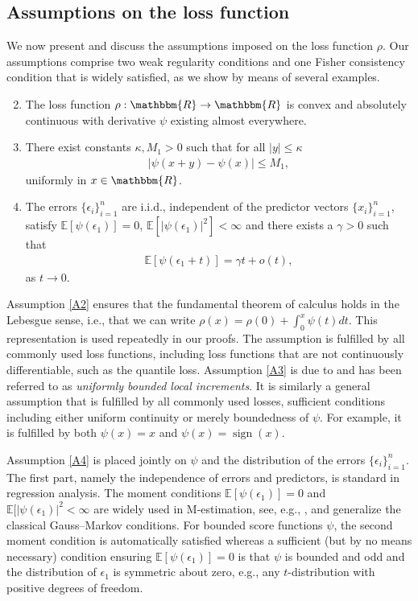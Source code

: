 \documentclass[11pt]{article}
\theoremstyle{definition}
\theoremstyle{remark}
\DeclareMathOperator{\sign}{sign}
\begin{document}
\subsection{Assumptions on the loss function}
\label{sec:loss}

We now present and discuss the assumptions imposed on the loss function $\rho$. Our assumptions comprise two weak regularity conditions and one Fisher consistency condition that is widely satisfied, as we show by means of several examples.

\begin{enumerate}[label=(A\arabic*), ref=(A\arabic*)]
\setcounter{enumi}{1}
\item \label{A2} The loss function $\rho: \mathbbm{R} \to \mathbbm{R}$ is convex and absolutely continuous with derivative $\psi$ existing almost everywhere.
\item \label{A3} There exist constants $\kappa, M_1>0$ such that for all $|y| \leq \kappa$
\begin{align*}
|\psi(x+y)-\psi(x)| \leq M_1,
\end{align*}
uniformly in $x \in \mathbbm{R}$.
\item \label{A4} The errors $\{\epsilon_i\}_{i=1}^n$ are i.i.d., independent of the predictor vectors $\{x_i\}_{i=1}^n$, satisfy $\mathbb{E}[\psi(\epsilon_1)] =0$, $\mathbb{E}[|\psi(\epsilon_1)|^2]<\infty$ and there exists a $\gamma>0$ such that
\begin{align*}
\mathbb{E} \left[ \psi(\epsilon_1+t) \right] = \gamma t + o(t),
\end{align*}
as $t \to 0$.
\end{enumerate}

Assumption \ref{A2} ensures that the fundamental theorem of calculus holds in the Lebesgue sense, i.e., that we can write $\rho(x) = \rho(0) + \int_{0}^x \psi(t) dt$. This representation is used repeatedly in our proofs. The assumption is fulfilled  by all commonly used loss functions, including loss functions that are not continuously differentiable, such as the quantile loss. Assumption \ref{A3} is due to \citet{Bai:1994} and has been referred to as \textit{uniformly bounded local increments}. It is similarly a general assumption that is fulfilled by all commonly used losses, sufficient conditions including either uniform continuity or merely boundedness of $\psi$. For example, it is fulfilled by both $\psi(x) = x$  and $\psi(x) = \sign(x)$.
 
Assumption \ref{A4} is placed jointly on $\psi$ and the distribution of the errors $\{\epsilon_i\}_{i=1}^n$. The first part, namely the independence of errors and predictors, is standard in regression analysis. The moment conditions $\mathbb{E}[\psi(\epsilon_1)] = 0$ and $\mathbb{E}[|\psi(\epsilon_1)|^2 < \infty$ are widely used in M-estimation, see, e.g., \citep[Section 10.6]{Mar:2019}, and generalize the classical Gauss--Markov conditions. For bounded score functions $\psi$, the second moment condition is automatically satisfied whereas a sufficient (but by no means necessary) condition ensuring $\mathbb{E}[\psi(\epsilon_1)] = 0$ is that $\psi$ is bounded and odd and the distribution of $\epsilon_1$ is symmetric about zero, e.g., any $t$-distribution with positive degrees of freedom.
\end{document}
